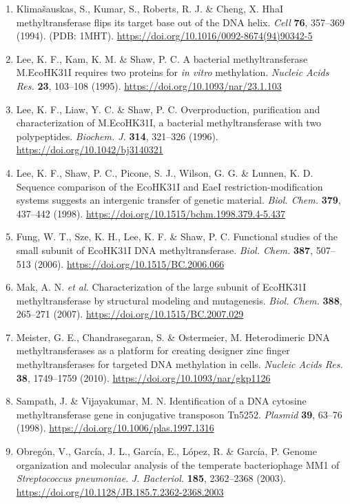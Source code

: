 \documentclass[10pt,letterpaper]{article}
\newcommand{\spname}[1]{\textit{#1}}
\begin{document}
{\begin{enumerate}[leftmargin=1.9em,itemsep=-0.6pt,parsep=0pt,topsep=0.5pt]
  \item Klima\v{s}auskas, S., Kumar, S., Roberts, R. J. \& Cheng, X. HhaI methyltransferase flips its target base out of the DNA helix. \textit{Cell} \textbf{76}, 357--369 (1994). (PDB: 1MHT). \url{https://doi.org/10.1016/0092-8674(94)90342-5}
  \item Lee, K. F., Kam, K. M. \& Shaw, P. C. A bacterial methyltransferase M.EcoHK31I requires two proteins for \textit{in vitro} methylation. \textit{Nucleic Acids Res.} \textbf{23}, 103--108 (1995). \url{https://doi.org/10.1093/nar/23.1.103}
  \item Lee, K. F., Liaw, Y. C. \& Shaw, P. C. Overproduction, purification and characterization of M.EcoHK31I, a bacterial methyltransferase with two polypeptides. \textit{Biochem. J.} \textbf{314}, 321--326 (1996). \url{https://doi.org/10.1042/bj3140321}
  \item Lee, K. F., Shaw, P. C., Picone, S. J., Wilson, G. G. \& Lunnen, K. D. Sequence comparison of the EcoHK31I and EaeI restriction-modification systems suggests an intergenic transfer of genetic material. \textit{Biol. Chem.} \textbf{379}, 437--442 (1998). \url{https://doi.org/10.1515/bchm.1998.379.4-5.437}
  \item Fung, W. T., Sze, K. H., Lee, K. F. \& Shaw, P. C. Functional studies of the small subunit of EcoHK31I DNA methyltransferase. \textit{Biol. Chem.} \textbf{387}, 507--513 (2006). \url{https://doi.org/10.1515/BC.2006.066}
  \item Mak, A. N. \textit{et al.} Characterization of the large subunit of EcoHK31I methyltransferase by structural modeling and mutagenesis. \textit{Biol. Chem.} \textbf{388}, 265--271 (2007). \url{https://doi.org/10.1515/BC.2007.029}
  \item Meister, G. E., Chandrasegaran, S. \& Ostermeier, M. Heterodimeric DNA methyltransferases as a platform for creating designer zinc finger methyltransferases for targeted DNA methylation in cells. \textit{Nucleic Acids Res.} \textbf{38}, 1749--1759 (2010). \url{https://doi.org/10.1093/nar/gkp1126}
  \item Sampath, J. \& Vijayakumar, M. N. Identification of a DNA cytosine methyltransferase gene in conjugative transposon Tn5252. \textit{Plasmid} \textbf{39}, 63--76 (1998). \url{https://doi.org/10.1006/plas.1997.1316}
  \item Obreg\'on, V., Garc\'ia, J. L., Garc\'ia, E., L\'opez, R. \& Garc\'ia, P. Genome organization and molecular analysis of the temperate bacteriophage MM1 of \spname{Streptococcus pneumoniae}. \textit{J. Bacteriol.} \textbf{185}, 2362--2368 (2003). \url{https://doi.org/10.1128/JB.185.7.2362-2368.2003}

\end{enumerate}}
\end{document}
